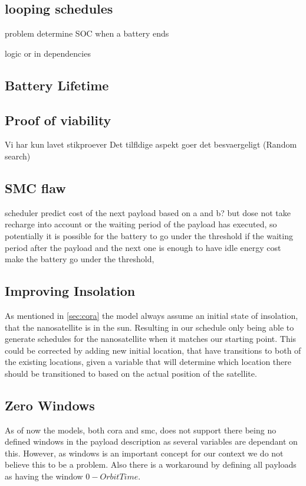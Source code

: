\subsection{looping schedules}
problem determine SOC when a battery ends 

logic or in dependencies

\subsection{Battery Lifetime} \label{subsec:disc_life}



\subsection{Proof of viability}
Vi har kun lavet stikproever
Det tilfldige aspekt goer det besvaergeligt (Random search)

\subsection{SMC flaw}
scheduler predict cost of the next payload based on a and b? but dose not take recharge into account or the waiting period of the payload has executed, so potentially it is possible for the battery to go under the threshold if the waiting period after the payload and the next one is enough to have idle energy cost make the battery go under the threshold,  

\subsection{Improving Insolation}
As mentioned in \cref{sec:cora} the model always assume an initial state of insolation, that the nanosatellite is in the sun. Resulting in our schedule only being able to generate schedules for the nanosatellite when it matches our starting point.
This could be corrected by adding new initial location, that have transitions to both of the existing locations, given a variable that will determine which location there should be transitioned to based on the actual position of the satellite.

\subsection{Zero Windows}
As of now the models, both \gls{cora} and \gls{smc}, does not support there being no defined windows in the payload description as several variables are dependant on this. However, as windows is an important concept for our context we do not believe this to be a problem. Also there is a workaround by defining all payloads as having the window $0-OrbitTime$.

